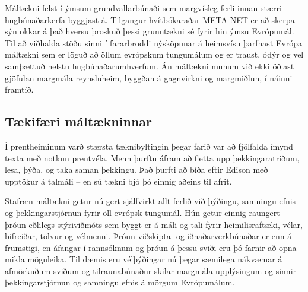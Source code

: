 \begin{multicols}{2}
Máltækni felst í ýmsum grundvallarbúnaði sem margvísleg ferli innan stærri hugbúnaðarkerfa byggjast á. Tilgangur hvítbókaraðar META-NET er að skerpa sýn okkar á það hversu þroskuð þessi grunntækni sé fyrir hin ýmsu Evrópumál. 
Til að viðhalda stöðu sinni í fararbroddi nýsköpunar á heimsvísu þarfnast Evrópa máltækni sem er löguð að öllum evrópskum tungumálum og er traust, ódýr og vel samþættuð helstu hugbúnaðarumhverfum. Án máltækni munum við ekki öðlast gjöfulan margmála reynsluheim, byggðan á gagnvirkni og margmiðlun, í náinni framtíð. 

\subsection{Tækifæri máltækninnar}

Í prentheiminum varð stærsta tæknibyltingin þegar farið var að fjölfalda ímynd texta með notkun prentvéla. Menn þurftu áfram að fletta upp þekkingaratriðum, lesa, þýða, og taka saman þekkingu. Það þurfti að bíða eftir Edison með upptökur á talmáli -- en sú tækni bjó þó einnig aðeins til afrit.

Stafræn máltækni getur nú gert sjálfvirkt allt ferlið við þýðingu, samningu efnis og þekkingarstjórnun fyrir öll evrópsk tungumál. Hún getur einnig raungert þróun eðlilegs stýriviðmóts sem byggt er á máli og tali fyrir heimilisraftæki, vélar, bifreiðar, tölvur og vélmenni. Þróun viðskipta- og iðnaðarverkbúnaðar er enn á frumstigi, en áfangar í rannsóknum og þróun á þessu sviði eru þó farnir að opna mikla möguleika. Til dæmis eru vélþýðingar nú þegar sæmilega nákvæmar á afmörkuðum sviðum og tilraunabúnaður skilar margmála upplýsingum og sinnir þekkingarstjórnun og samningu efnis á mörgum Evrópumálum.


\end{multicols}
